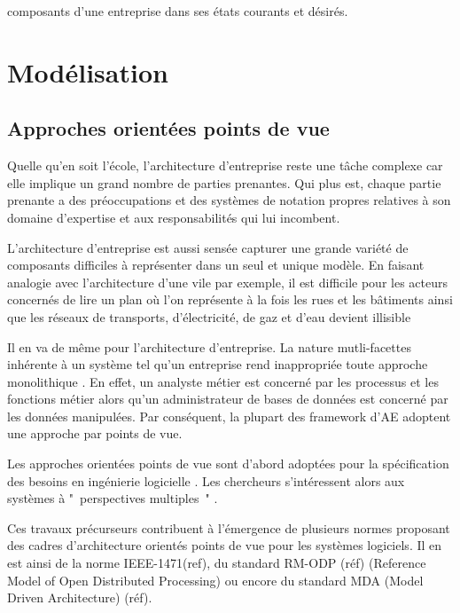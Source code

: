 composants d'une entreprise dans ses états courants et désirés.  

\section{Modélisation}

	\subsection{Approches orientées points de vue}

Quelle qu'en soit l'école, l'architecture d'entreprise reste une tâche complexe 
\cite{steen2004supporting} car elle implique un grand nombre de parties prenantes. Qui plus est, chaque partie prenante a des préoccupations et des systèmes de notation propres relatives à son domaine d'expertise et aux responsabilités qui lui incombent.

L'architecture d'entreprise est aussi sensée capturer une grande variété de composants difficiles à représenter dans un seul et unique modèle. 
En faisant analogie avec l'architecture d'une vile par exemple, il est difficile pour les acteurs concernés de lire un plan où l'on représente à la fois les rues et les bâtiments ainsi que les réseaux de transports, d'électricité, de gaz et d'eau devient illisible 

Il en va de même pour l'architecture d'entreprise. La nature mutli-facettes inhérente à un système tel qu'un entreprise rend inappropriée toute approche monolithique \cite{armour1999bigpicture}. En effet, un analyste métier est concerné par les 
processus et les fonctions métier alors qu'un administrateur de bases de données 
est concerné par les données manipulées. Par conséquent, la plupart des 
framework d'AE adoptent une approche par points de vue.

Les approches orientées points de vue sont d'abord adoptées pour la 
spécification des besoins en ingénierie logicielle \cite{mullery1979core}. Les 
chercheurs s'intéressent alors aux systèmes à "~perspectives multiples~" 
\cite{finkelstein1992viewpoints} \cite{kotonya1996requirements} 
\cite{nuseibeh1994multi} \cite{meyers1993representing}. 

Ces travaux précurseurs contribuent à l'émergence de plusieurs normes proposant 
des cadres d'architecture orientés points de vue pour les systèmes logiciels. Il 
en est ainsi de la norme IEEE-1471(ref), du standard RM-ODP (réf) (Reference 
Model of Open Distributed Processing) ou encore du standard MDA (Model Driven 
Architecture) (réf).

